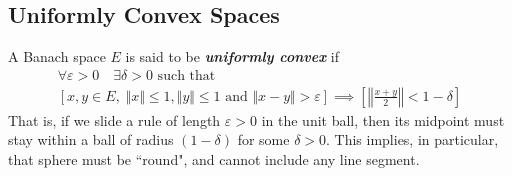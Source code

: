 \documentclass{article}
\theoremstyle{definition}
\numberwithin{equation}{section}
\begin{document}
	\subsection{Uniformly Convex Spaces}
A Banach space $E$ is said to be \textbf{\textit{uniformly convex}} if 
\begin{gather*}
	\forall\varepsilon>0\quad\exists\delta>0\text{ such that}\\
	[x,y\in E,\;\Vert x\Vert\leq1,\Vert y\Vert\leq1\text{ and }\Vert x-y\Vert>\varepsilon]\implies\left[\left\Vert\frac{x+y}{2}\right\Vert<1-\delta\right]
\end{gather*}
That is, if we slide a rule of length $\varepsilon>0$ in the unit ball, then its midpoint must stay within a ball of radius $(1-\delta)$ for some $\delta>0$. This implies, in particular, that sphere must be ``round", and cannot include any line segment.
\end{document}
